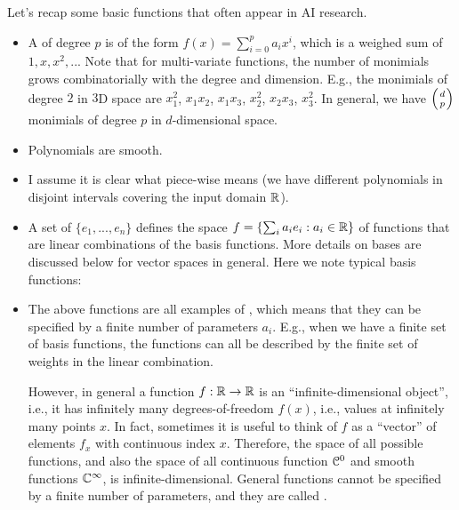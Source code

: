 Let's recap some basic functions that often appear in AI research.
\begin{itemize}
\item A  of degree $p$ is of the form $f(x) = \sum_{i=0}^p a_i x^i$, which is a weighed sum of  $1, x, x^2,..$. Note that for multi-variate functions, the number of monimials grows combinatorially with the degree and dimension. E.g., the monimials of degree $2$ in $3$D space are $x_1^2$, $x_1 x_2$, $x_1 x_3$, $x_2^2$, $x_2 x_3$, $x_3^2$. In general, we have $\left(d \atop p\right)$ monimials of degree $p$ in $d$-dimensional space.
\item Polynomials are smooth.
\item I assume it is clear what piece-wise means (we have different polynomials in disjoint intervals covering the input domain ${\mathbb{R}}$).

\item A set of  $\{e_1,...,e_n\}$  defines the space $f = \{ \sum_i a_i e_i : a_i \in {\mathbb{R}} \}$ of functions that are linear combinations of the basis functions. More details on bases are discussed below for vector spaces in general. Here we note typical basis functions:

\item The above functions are all examples of , which means that they can be specified by a finite number of parameters $a_i$. E.g., when we have a finite set of basis functions, the functions can all be described by the finite set of weights in the linear combination.

However, in general a function $f:{\mathbb{R}} \to {\mathbb{R}}$ is an ``infinite-dimensional object'', i.e., it has infinitely many degrees-of-freedom $f(x)$, i.e., values at infinitely many points $x$. In fact, sometimes it is useful to think of $f$ as a ``vector'' of elements $f_x$ with continuous index $x$. Therefore, the space of all possible functions, and also the space of all continuous function ${\cal C}^0$ and smooth functions ${\mathbb{C}}^\infty$, is infinite-dimensional. General functions cannot be specified by a finite number of parameters, and they are called .


\end{itemize}
